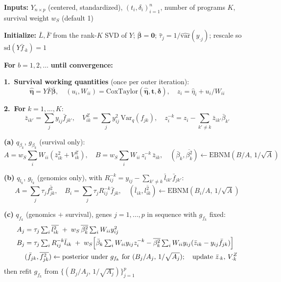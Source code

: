 \documentclass[11pt]{article}
\newcommand{\lbar}[2]{\bar{l}_{#1#2}}
\newcommand{\fbar}[2]{\bar{f}_{#1#2}}
\newcommand{\zbar}[2]{\bar{z}_{#1#2}}
\newcommand{\betabar}[1]{\bar{\beta}_{#1}}
\newcommand{\lsec}[2]{\overline{l^2_{#1#2}}}
\newcommand{\fsec}[2]{\overline{f^2_{#1#2}}}
\newcommand{\betasec}[1]{\overline{\beta^2_{#1}}}
\newcommand{\Var}{\mathrm{Var}_q}
\newcommand{\ws}{w_S}
\begin{document}
\begin{tcolorbox}[colback=gray!5, colframe=black!60,
                  title=Supervised Matrix Factorization (YFB) --- CAVI Algorithm,
                  fonttitle=\bfseries]

\textbf{Inputs:} $Y_{n\times p}$ (centered, standardized), $(t_i,\delta_i)_{i=1}^n$,
number of programs $K$, survival weight $\ws$ (default 1)

\textbf{Initialize:} $\bar L,\bar F$ from the rank-$K$ SVD of $Y$; $\bar{\bm\beta}=\bm 0$;
$\hat\tau_j = 1/\widehat{\mathrm{var}}(y_{\cdot j})$; rescale so $\mathrm{sd}(Y\fbar{\cdot}{k}) = 1$

\medskip
\textbf{For} $b = 1, 2, \ldots$ \textbf{until convergence:}

\smallskip
\quad\textbf{1.\ Survival working quantities} (once per outer iteration):
\[
  \hat{\bm\eta} = Y\bar F\bar{\bm\beta},\quad
  (u_i, W_{ii}) = \text{CoxTaylor}(\hat{\bm\eta}, \bm t, \bm\delta),\quad
  z_i = \hat\eta_i + u_i/W_{ii}
\]

\quad\textbf{2.\ For} $k = 1,\ldots,K$:
\[
  \zbar{i}{k'} = \textstyle\sum_j y_{ij}\fbar{j}{k'},\quad
  V^Z_{ik} = \textstyle\sum_j y_{ij}^2\,\Var(f_{jk}),\quad
  z^{-k}_i = z_i - \textstyle\sum_{k'\ne k}\zbar{i}{k'}\betabar{k'}
\]

\qquad\textbf{(a)} $q_{\beta_k}$, $g_{\beta_k}$ (survival only):
\[
  A = \ws\textstyle\sum_i W_{ii}(\zbar{i}{k}^2 + V^Z_{ik}),\quad
  B = \ws\textstyle\sum_i W_{ii}\,z^{-k}_i\,\zbar{i}{k},\quad
  (\betabar{k},\betasec{k}) \leftarrow \mathrm{EBNM}(B/A,\,1/\sqrt A)
\]

\qquad\textbf{(b)} $q_{l_k}$, $g_{l_k}$ (genomics only), with
$R^{-k}_{ij} = y_{ij} - \sum_{k'\ne k}\lbar{i}{k'}\fbar{j}{k'}$:
\[
  A = \textstyle\sum_j\tau_j\fsec{j}{k},\quad
  B_i = \textstyle\sum_j\tau_j R^{-k}_{ij}\fbar{j}{k},\quad
  (\lbar{i}{k},\lsec{i}{k}) \leftarrow \mathrm{EBNM}(B_i/A,\,1/\sqrt A)
\]

\qquad\textbf{(c)} $q_{f_k}$ (genomics $+$ survival), genes $j = 1,\ldots,p$ in
sequence with $g_{f_k}$ fixed:
\begin{align*}
  A_j &= \tau_j\textstyle\sum_i\lsec{i}{k} \;+\; \ws\,\betasec{k}\textstyle\sum_i W_{ii}y_{ij}^2\\
  B_j &= \tau_j\textstyle\sum_i R^{-k}_{ij}\lbar{i}{k}
     \;+\; \ws\Bigl[\betabar{k}\textstyle\sum_i W_{ii}y_{ij}z^{-k}_i
     - \betasec{k}\textstyle\sum_i W_{ii}y_{ij}(\zbar{i}{k} - y_{ij}\fbar{j}{k})\Bigr]\\
  &(\fbar{j}{k},\fsec{j}{k}) \leftarrow \text{posterior under } g_{f_k}
    \text{ for } (B_j/A_j,\,1/\sqrt{A_j});\quad
    \text{update } \zbar{\cdot}{k},\,V^Z_{\cdot k}
\end{align*}
\qquad{} then refit $g_{f_k}$ from $\{(B_j/A_j,\,1/\sqrt{A_j})\}_{j=1}^p$


\end{tcolorbox}
\end{document}

